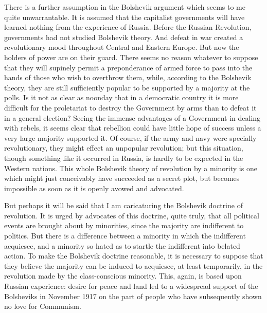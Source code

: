 There is a further assumption in the Bolshevik argument which seems to me quite unwarrantable. It is assumed that the capitalist governments will have learned nothing from the experience of Russia. Before the Russian Revolution, governments had not studied Bolshevik theory. And defeat in war created a revolutionary mood throughout Central and Eastern Europe. But now the holders of power are on their guard. There seems no reason whatever to suppose that they will supinely permit a preponderance of armed force to pass into the hands of those who wish to overthrow them, while, according to the Bolshevik theory, they are still sufficiently popular to be supported by a majority at the polls. Is it not as clear as noonday that in a democratic country it is more difficult for the proletariat to destroy the Government by arms than to defeat it in a general election? Seeing the immense advantages of a Government in dealing with rebels, it seems clear that rebellion could have little hope of success unless a very large majority supported it. Of course, if the army and navy were specially revolutionary, they might effect an unpopular revolution; but this situation, though something like it occurred in Russia, is hardly to be expected in the Western nations. This whole Bolshevik theory of revolution by a minority is one which might just conceivably have succeeded as a secret plot, but becomes impossible as soon as it is openly avowed and advocated.

But perhaps it will be said that I am caricaturing the Bolshevik doctrine of revolution. It is urged by advocates of this doctrine, quite truly, that all political events are brought about by minorities, since the majority are indifferent to politics. But there is a difference between a minority in which the indifferent acquiesce, and a minority so hated as to startle the indifferent into belated action. To make the Bolshevik doctrine reasonable, it is necessary to suppose that they believe the majority can be induced to acquiesce, at least temporarily, in the revolution made by the class-conscious minority. This, again, is based upon Russian experience: desire for peace and land led to a widespread support of the Bolsheviks in November 1917 on the part of people who have subsequently shown no love for Communism.

